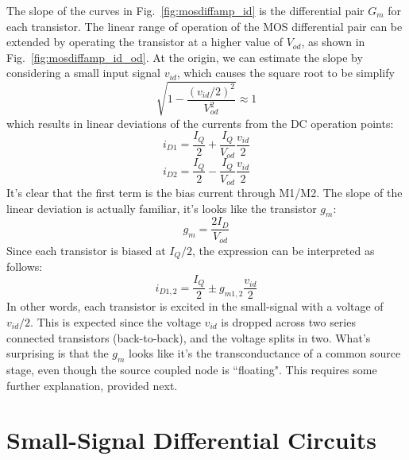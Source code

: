 The slope of the curves in Fig.~\ref{fig:mosdiffamp_id} is the differential pair $G_m$ for each transistor.   The linear range of operation of the MOS differential pair can be extended by operating the transistor at a higher value of $V_{od}$, as shown in Fig.~\ref{fig:mosdiffamp_id_od}.   At the origin, we can estimate the slope by considering a small input signal $v_{id}$, which causes the square root to be simplify
\begin{equation} 
	\sqrt {1 - \frac{{{{({v_{id}}/2)}^2}}}{{V_{od}^2}}}  \approx 1
\end{equation}
which results in linear deviations of the currents from the DC operation points:
\begin{equation} 
	{i_{D1}} = \frac{I_Q}{2} + \frac{I_Q}{{{V_{od}}}}\frac{{{v_{id}}}}{2} 
\end{equation}
\begin{equation} 
	{i_{D2}} = \frac{I_Q}{2} - \frac{I_Q}{{{V_{od}}}}\frac{{{v_{id}}}}{2}
\end{equation}
It's clear that the first term is the bias current through M1/M2.  The slope of the linear deviation is actually familiar, it's looks like the transistor $g_m$:
\begin{equation}
	g_m = \frac{2 I_D}{V_{od}}
\end{equation}
Since each transistor is biased at $I_Q/2$, the expression can be interpreted as follows:
\begin{equation} 
	{i_{D1,2}} = \frac{I_Q}{2} \pm g_{m1,2} \frac{{{v_{id}}}}{2}
\end{equation}
In other words, each transistor is excited in the small-signal with a voltage of $v_{id}/2$.  This is expected since the voltage $v_{id}$ is dropped across two series connected transistors (back-to-back), and the voltage splits in two.  What's surprising is that the $g_m$ looks like it's the transconductance of a common source stage, even though the source coupled node is ``floating".  This requires some further explanation, provided next.
\section{Small-Signal Differential Circuits}

